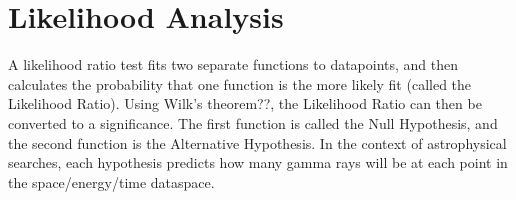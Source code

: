 \section{Likelihood Analysis}

A likelihood ratio test fits two separate functions to datapoints, and then calculates the probability that one function is the more likely fit (called the Likelihood Ratio).
Using Wilk's theorem??, the Likelihood Ratio can then be converted to a significance.
The first function is called the Null Hypothesis, and the second function is the Alternative Hypothesis.
In the context of astrophysical searches, each hypothesis predicts how many gamma rays will be at each point in the space/energy/time dataspace.

